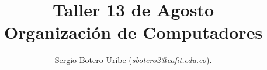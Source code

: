 \documentclass[%
	final,
	notitlepage,
	narroweqnarray,
	inline,
	twoside,
	]{ieee}
\begin{document}
\title[Ensayo memorias caché Sun]{%
       Taller 13 de Agosto \\  Organización de Computadores}

\author[]{Sergio Botero Uribe (\textit{sbotero2@eafit.edu.co}).
}


\titletext{, \today}


\maketitle               
\end{document}
